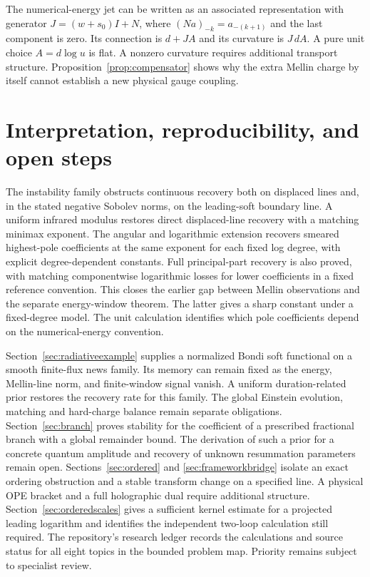 \documentclass[11pt]{article}
\theoremstyle{remark}\newtheorem{remark}[theorem]{Remark}
\begin{document}
The numerical-energy jet can be written as an associated representation with generator $J=(w+s_0)I+N$, where $(Na)_{-k}=a_{-(k+1)}$ and the last component is zero. Its connection is $d+JA$ and its curvature is $J\,dA$. A pure unit choice $A=d\log u$ is flat. A nonzero curvature requires additional transport structure. Proposition~\ref{prop:compensator} shows why the extra Mellin charge by itself cannot establish a new physical gauge coupling.

\section{Interpretation, reproducibility, and open steps}
The instability family obstructs continuous recovery both on displaced lines and, in the stated negative Sobolev norms, on the leading-soft boundary line. A uniform infrared modulus restores direct displaced-line recovery with a matching minimax exponent. The angular and logarithmic extension recovers smeared highest-pole coefficients at the same exponent for each fixed log degree, with explicit degree-dependent constants. Full principal-part recovery is also proved, with matching componentwise logarithmic losses for lower coefficients in a fixed reference convention. This closes the earlier gap between Mellin observations and the separate energy-window theorem. The latter gives a sharp constant under a fixed-degree model. The unit calculation identifies which pole coefficients depend on the numerical-energy convention.

Section~\ref{sec:radiativeexample} supplies a normalized Bondi soft functional on a smooth finite-flux news family. Its memory can remain fixed as the energy, Mellin-line norm, and finite-window signal vanish. A uniform duration-related prior restores the recovery rate for this family. The global Einstein evolution, matching and hard-charge balance remain separate obligations. Section~\ref{sec:branch} proves stability for the coefficient of a prescribed fractional branch with a global remainder bound. The derivation of such a prior for a concrete quantum amplitude and recovery of unknown resummation parameters remain open. Sections~\ref{sec:ordered} and \ref{sec:frameworkbridge} isolate an exact ordering obstruction and a stable transform change on a specified line. A physical OPE bracket and a full holographic dual require additional structure. Section~\ref{sec:orderedscales} gives a sufficient kernel estimate for a projected leading logarithm and identifies the independent two-loop calculation still required. The repository's research ledger records the calculations and source status for all eight topics in the bounded problem map. Priority remains subject to specialist review.
\end{document}
